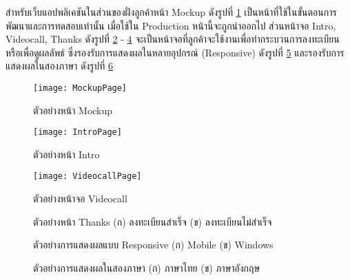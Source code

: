สำหรับเว็บแอปพลิเคชันในส่วนของฝั่งลูกค้าหน้า Mockup ดังรูปที่ \ref{Fig:mockup} เป็นหน้าที่ใช้ในขั้นตอนการพัฒนาและการทดสอบเท่านั้น เมื่อใช้ใน Production หน้านี้จะถูกนำออกไป ส่วนหน้าจอ Intro, Videocall, Thanks ดังรูปที่ \ref{Fig:intro} - \ref{Fig:thanks} จะเป็นหน้าจอที่ลูกค้าจะใช้งานเพื่อทำกระบวนการลงทะเบียนหรือเพื่อดูผลลัพธ์ ซึ่งรองรับการแสดงผลในหลายอุปกรณ์ (Responsive) ดังรูปที่ \ref{Fig:responsive}  และรองรับการแสดงผลในสองภาษา ดังรูปที่  \ref{Fig:lang} 
\begin{figure}[h]
	\centering
	\texttt{[image: MockupPage]}
	\caption{ตัวอย่างหน้า Mockup}
	\label{Fig:mockup}
\end{figure}
\begin{figure}[h]
	\centering
	\texttt{[image: IntroPage]}
	\caption{ตัวอย่างหน้า Intro}
	\label{Fig:intro}
\end{figure}
\begin{figure}[h]
	\centering
	\texttt{[image: VideocallPage]}
	\caption{ตัวอย่างหน้าจอ Videocall}
	 \label{Fig:videocall}
\end{figure}
\begin{figure}[!h]
	\centering
	\caption{ตัวอย่างหน้า Thanks (ก) ลงทะเบียนสำเร็จ (ข) ลงทะเบียนไม่สำเร็จ}
	\label{Fig:thanks}
\end{figure}
\begin{figure}[!h]
	\centering
	\quad
	\caption{ตัวอย่างการแสดงผลแบบ Responsive (ก) Mobile (ข) Windows}
	\label{Fig:responsive}
\end{figure}
\begin{figure}[!h]
	\centering
	\qquad
	\caption{ตัวอย่างการแสดงผลในสองภาษา (ก) ภาษาไทย (ข) ภาษาอังกฤษ}
	\label{Fig:lang}
\end{figure}


